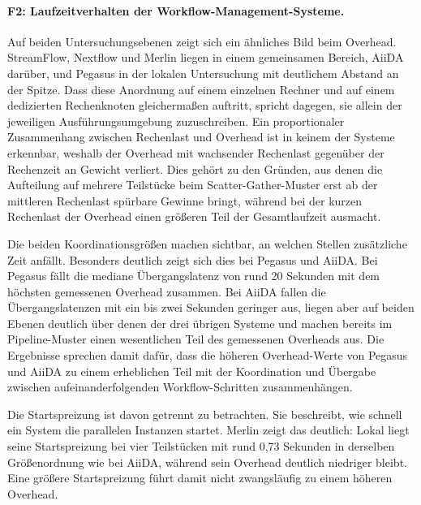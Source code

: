 \paragraph{F2: Laufzeitverhalten der Workflow-Management-Systeme.}
Auf beiden Untersuchungsebenen zeigt sich ein ähnliches Bild beim
Overhead. StreamFlow, Nextflow und Merlin liegen in einem
gemeinsamen Bereich, AiiDA darüber, und Pegasus in der lokalen
Untersuchung mit deutlichem Abstand an der Spitze. Dass
diese Anordnung auf einem einzelnen Rechner und auf einem
dedizierten Rechenknoten gleichermaßen auftritt, spricht dagegen,
sie allein der jeweiligen Ausführungsumgebung zuzuschreiben. Ein
proportionaler Zusammenhang zwischen Rechenlast und Overhead ist in
keinem der Systeme erkennbar, weshalb der Overhead mit wachsender
Rechenlast gegenüber der Rechenzeit an Gewicht verliert. Dies
gehört zu den Gründen, aus denen die Aufteilung auf mehrere
Teilstücke beim Scatter-Gather-Muster erst ab der mittleren
Rechenlast spürbare Gewinne bringt, während bei der kurzen
Rechenlast der Overhead einen größeren Teil der Gesamtlaufzeit ausmacht.

Die beiden Koordinationsgrößen machen sichtbar, an welchen Stellen zusätzliche Zeit anfällt. Besonders deutlich zeigt sich dies bei Pegasus und AiiDA. Bei Pegasus fällt die mediane Übergangslatenz von rund 20 Sekunden mit dem höchsten gemessenen Overhead zusammen. Bei AiiDA fallen die Übergangslatenzen mit ein bis zwei Sekunden geringer aus, liegen aber auf beiden Ebenen deutlich über denen der drei übrigen Systeme und machen bereits im Pipeline-Muster einen wesentlichen Teil
des gemessenen Overheads aus. Die Ergebnisse sprechen damit dafür, dass die höheren Overhead-Werte von Pegasus und AiiDA zu einem erheblichen Teil mit der Koordination und Übergabe
zwischen aufeinanderfolgenden Workflow-Schritten zusammenhängen.

Die Startspreizung ist davon getrennt zu betrachten. Sie beschreibt, wie schnell ein System die parallelen Instanzen startet. Merlin zeigt das deutlich: Lokal liegt seine
Startspreizung bei vier Teilstücken mit rund 0,73 Sekunden in
derselben Größenordnung wie bei AiiDA, während sein Overhead
deutlich niedriger bleibt. Eine größere Startspreizung führt damit
nicht zwangsläufig zu einem höheren Overhead.

